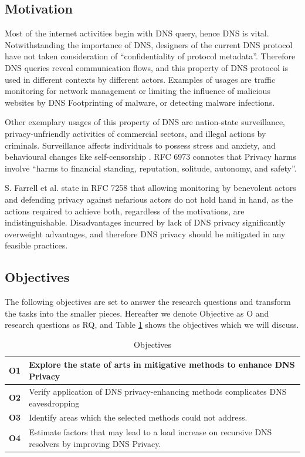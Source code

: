 \documentclass[a4paper,12pt]{article}
\begin{document}
\subsection{Motivation}
Most of the internet activities begin with DNS query, hence DNS is vital. Notwithstanding the importance of DNS, designers of the current DNS protocol have not taken consideration of ``confidentiality of protocol metadata''. Therefore DNS queries reveal communication flows, and this property of DNS protocol is used in different contexts by different actors. Examples of usages are traffic monitoring for network management or limiting the influence of malicious websites by DNS Footprinting of malware\cite{stoner2010dns}, or detecting malware infections\cite{lemos2013got}.

Other exemplary usages of this property of DNS are nation-state surveillance, privacy-unfriendly activities of commercial sectors\cite{weaver2011redirecting}, and illegal actions by criminals. Surveillance affects individuals to possess stress and anxiety\cite{oulasvirta2012long}, and behavioural changes like self-censorship \cite{rfc6973}. RFC 6973 connotes that Privacy harms involve ``harms to financial standing, reputation, solitude, autonomy, and safety\cite{rfc6973}''.

S. Farrell et al. state in RFC 7258 that allowing monitoring by benevolent actors and defending privacy against nefarious actors do not hold hand in hand, as the actions required to achieve both, regardless of the motivations, are indistinguishable\cite{rfc7258}.
Disadvantages incurred by lack of DNS privacy significantly overweight advantages, and therefore DNS privacy should be mitigated in any feasible practices.
\subsection{Objectives}
The following objectives are set to answer the research questions and transform the tasks into the smaller pieces. Hereafter we denote Objective as O and research questions as RQ, and Table \ref{objectives} shows the objectives which we will discuss.
\begin{table}[h!]
    \begin{tabular} {|p{1.2cm}|p{12.8cm}|} \hline
        \textbf{O1} & Explore the state of arts in mitigative methods to enhance DNS Privacy \\ \hline
        \textbf{O2} & Verify application of DNS privacy-enhancing methods complicates DNS eavesdropping\\ \hline
        \textbf{O3} & Identify areas which the selected methods could not address. \\ \hline
        \textbf{O4} & Estimate factors that may lead to a load increase on recursive DNS resolvers by improving DNS Privacy.\\ \hline
    \end{tabular}
    \caption{Objectives}
    \label{objectives}
\end{table}
\end{document}
